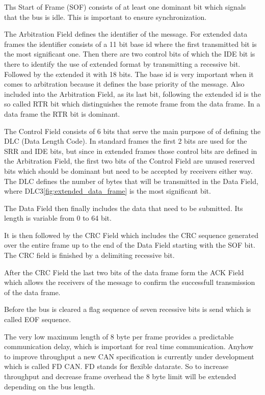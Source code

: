 	Ths Start of Frame (SOF) consists of at least one dominant bit which signals
	that the bus is idle. This is important to ensure synchronization.
	
	The Arbitration Field defines the identifier of the message. For extended data
	frames the identifier consists of a 11 bit base id where the first transmitted
	bit is the most significant one. Then there are two control bits of which the
	IDE bit is there to identify the use of extended format by transmitting a
	recessive bit. Followed by the extended it with 18 bits. The base id is very
	important when it comes to arbitration because it defines the base priority of
	the message.
	Also included into the Arbitration Field, as its last bit, following the
	extended id is the so called RTR bit which distinguishes the remote frame from the data
	frame. In a data frame the RTR bit is dominant.
	
	The Control Field consists of 6 bits that serve the main purpose of of defining
	the DLC (Data Length Code). In standard frames the first 2 bits are used for
	the SRR and IDE bits, but since in extended frames those control bits are
	defined in the Arbitration Field, the first two bits of the Control Field are
	unused reserved bits which should be dominant but need to be accepted by
	receivers either way. The DLC defines the number of bytes that will be
	transmitted in the Data Field, where DLC3\autoref{fig:extended_data_frame} is
	the most significant bit.
	
	The Data Field then finally includes the data that need to be submitted. Its
	length is variable from 0 to 64 bit. 
	
	It is then followed by the CRC Field which includes the CRC sequence generated
	over the entire frame up to the end of the Data Field starting with the SOF
	bit. The CRC field is finished by a delimiting recessive bit. 
	
	After the CRC Field the last two bits of the data frame form the ACK Field
	which allows the receivers of the message to confirm the
	successfull transmission of the data frame.
	
	Before the bus is cleared a flag sequence of seven recessive bits is send which
	is called EOF sequence.
	
	The very low maximum length of 8 byte per frame provides a predictable
	communication delay, which is important for real time communication. Anyhow
	to improve throughput a new CAN specification is currently under development
	which is called FD CAN. FD stands for flexible datarate. So to increase
	throughput and decrease frame overhead the 8 byte limit will be extended
	depending on the bus length. 
	 
